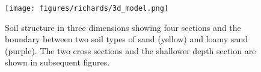 \begin{figure}[!htbp]
\begin{center}
\texttt{[image: figures/richards/3d\_model.png]}
\end{center}
\caption{
Soil structure in three dimensions showing four sections and the boundary between two soil types of sand (yellow) and loamy sand (purple). The two cross sections and the shallower depth section are shown in subsequent figures.
}
\label{fig:richards-3d_model}
\end{figure}
